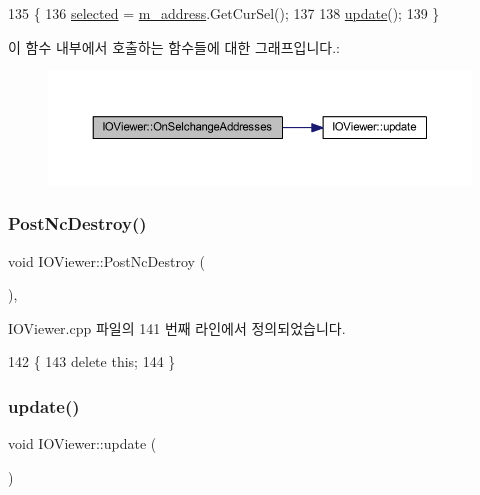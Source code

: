 \begin{DoxyCode}
135 \{
136   \mbox{\hyperlink{class_i_o_viewer_a418dd29c924f6fa180e995ba9db8399c}{selected}} = \mbox{\hyperlink{class_i_o_viewer_ab381b72aee2da8c7f3c25ba58c69c3cd}{m\_address}}.GetCurSel();
137  
138   \mbox{\hyperlink{class_i_o_viewer_a500c8fc593280ff95977fb59293b6ab6}{update}}();
139 \}
\end{DoxyCode}
이 함수 내부에서 호출하는 함수들에 대한 그래프입니다.\+:
\nopagebreak
\begin{figure}[H]
\begin{center}
\leavevmode
\includegraphics[width=350pt]{class_i_o_viewer_a406130e0b8572721cf8ede30d2005fa2_cgraph}
\end{center}
\end{figure}
\mbox{\label{class_i_o_viewer_aba88a6282cb5c6e57cd169a1821182be}} 
\subsubsection{\texorpdfstring{Post\+Nc\+Destroy()}{PostNcDestroy()}}
{\footnotesize\ttfamily void I\+O\+Viewer\+::\+Post\+Nc\+Destroy (\begin{DoxyParamCaption}{ }\end{DoxyParamCaption})\hspace{0.3cm}{\ttfamily [protected]}, {\ttfamily [virtual]}}



I\+O\+Viewer.\+cpp 파일의 141 번째 라인에서 정의되었습니다.


\begin{DoxyCode}
142 \{
143   \textcolor{keyword}{delete} \textcolor{keyword}{this};
144 \}
\end{DoxyCode}
\mbox{\label{class_i_o_viewer_a500c8fc593280ff95977fb59293b6ab6}} 
\subsubsection{\texorpdfstring{update()}{update()}}
{\footnotesize\ttfamily void I\+O\+Viewer\+::update (\begin{DoxyParamCaption}{ }\end{DoxyParamCaption})\hspace{0.3cm}{\ttfamily [virtual]}}



